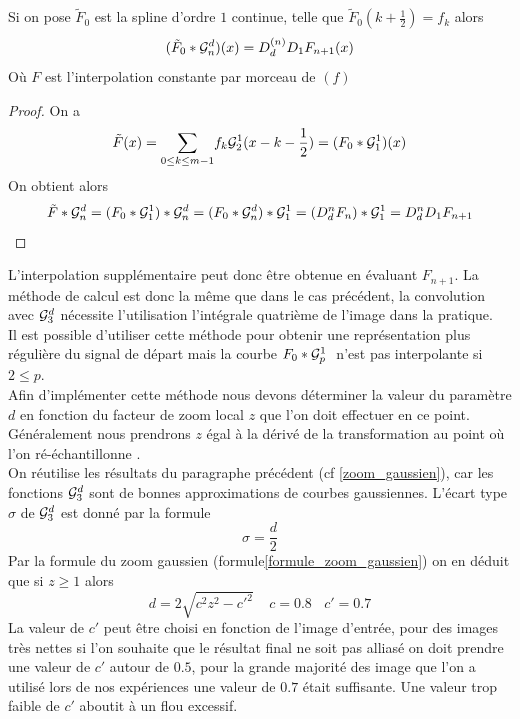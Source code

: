 \begin{prop} Si on pose $\tilde{F}_0$  est la spline d'ordre $1$ continue, telle que $\tilde{F}_0(k+\frac{1}{2})=f_k$ alors 
\begin{equation*}
( \tilde{F}_0 * \mathcal{G}_n^d ) (x) = D_d^{(n)}D_1 F_{n+1}(x)
\end{equation*}
Où $F$ est l'interpolation constante par morceau de $(f)$ 
\end{prop}
\begin{proof}
On a
\begin{equation*}
\tilde{F}(x)=\underset{0\le k \le m-1}{\sum} f_k \mathcal{G}_2^1 (x-k-\frac{1}{2})=(F_{0} *\mathcal{G}_1^1 )(x)
\end{equation*}
On obtient alors 
\begin{equation*}
\tilde{F}*\mathcal{G}_n^d=(F_{0}*\mathcal{G}_1^1)*\mathcal{G}_n^d=(F_{0}*\mathcal{G}_n^d)*\mathcal{G}_1^1=(D_d^n F_{n})*\mathcal{G}_1^1= D_d^n D_1 F_{n+1}
\end{equation*}
\end{proof}
L'interpolation supplémentaire peut donc être obtenue en évaluant $F_{n+1}$. La méthode de calcul est donc la même que dans le cas précédent, la convolution avec $\mathcal{G}_3^d$ nécessite  l'utilisation l'intégrale quatrième de l'image dans la pratique.\\
Il est possible d'utiliser cette méthode pour obtenir une représentation plus régulière du signal de départ mais la courbe $F_0 * \mathcal{G}_p^1~$ n'est pas  interpolante si $2\le p$.\\
Afin d'implémenter cette méthode nous devons déterminer la valeur du paramètre $d$ en fonction du facteur de zoom local $z$ que l'on doit effectuer en ce point. Généralement nous prendrons $z$ égal à la dérivé de la transformation au point où l'on ré-échantillonne .\\ 
On réutilise les résultats du paragraphe précédent (cf \ref{zoom_gaussien}), car les  fonctions $\mathcal{G}_3^d$ sont de bonnes approximations de courbes gaussiennes. L'écart type $\sigma$ de $\mathcal{G}_3^d$ est donné par la formule 
\begin{equation*}
\sigma=\frac{d}{2}
\end{equation*}
Par la formule du zoom gaussien (formule\ref{formule_zoom_gaussien}) on en déduit que si $z\ge 1$ alors
\begin{equation*}
d=2\sqrt{c^2 z^2 - c'^2}~~~~~c=0.8~~~~c'=0.7
\end{equation*}
La valeur de $c'$ peut être choisi en fonction de l'image d'entrée, pour des images très nettes si l'on souhaite que le résultat final ne soit pas alliasé on doit prendre une valeur de $c'$ autour de $0.5$, pour la grande majorité des image que l'on a utilisé lors de nos expériences une valeur de $0.7$ était suffisante. Une valeur trop faible de $c'$ aboutit à un flou excessif.

